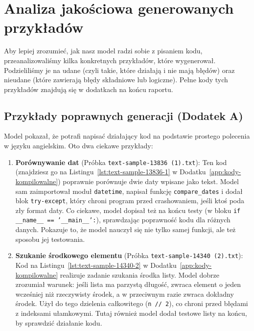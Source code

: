 \section{Analiza jakościowa generowanych przykładów}
\label{sec:przyklady}

Aby lepiej zrozumieć, jak nasz model radzi sobie z pisaniem kodu, przeanalizowaliśmy kilka konkretnych przykładów, które wygenerował. Podzieliliśmy je na udane (czyli takie, które działają i nie mają błędów) oraz nieudane (które zawierają błędy składniowe lub logiczne). Pełne kody tych przykładów znajdują się w dodatkach na końcu raportu.

\subsection{Przykłady poprawnych generacji (Dodatek A)}

Model pokazał, że potrafi napisać działający kod na podstawie prostego polecenia w języku angielskim. Oto dwa ciekawe przykłady:

\begin{enumerate}
  \item \textbf{Porównywanie dat} (Próbka \texttt{text-sample-13836 (1).txt}): 
  Ten kod (znajdziesz go na Listingu~\ref{lst:text-sample-13836-1} w Dodatku~\ref{app:kody-kompilowalne}) poprawnie porównuje dwie daty wpisane jako tekst. Model sam zaimportował moduł \texttt{datetime}, napisał funkcję \texttt{compare\_dates} i dodał blok \texttt{try-except}, który chroni program przed crashowaniem, jeśli ktoś poda zły format daty. Co ciekawe, model dopisał też na końcu testy (w bloku \texttt{if \_\_name\_\_ == '\_\_main\_\_':}), sprawdzając poprawność kodu dla różnych danych. Pokazuje to, że model nauczył się nie tylko samej funkcji, ale też sposobu jej testowania.
  
  \item \textbf{Szukanie środkowego elementu} (Próbka \texttt{text-sample-14340 (2).txt}):
  Kod na Listingu~\ref{lst:text-sample-14340-2} w Dodatku~\ref{app:kody-kompilowalne} realizuje zadanie szukania środka listy. Model dobrze zrozumiał warunek: jeśli lista ma parzystą długość, zwraca element o jeden wcześniej niż rzeczywisty środek, a w przeciwnym razie zwraca dokładny środek. Użył do tego dzielenia całkowitego (\texttt{n // 2}), co chroni przed błędami z indeksami ułamkowymi. Tutaj również model dodał testowe listy na końcu, by sprawdzić działanie kodu.
\end{enumerate}

